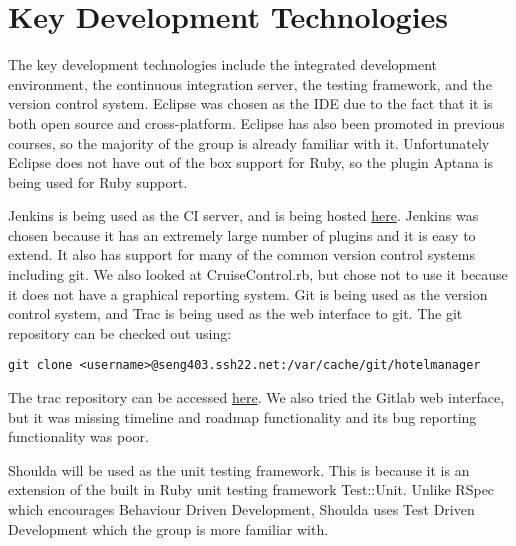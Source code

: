 \section{Key Development Technologies}

The key development technologies include the integrated development environment, the continuous integration server, the testing framework, and the version control system. Eclipse was chosen as the IDE due to the fact that it is both open source and cross-platform. Eclipse has also been promoted in previous courses, so the majority of the group is already familiar with it. Unfortunately Eclipse does not have out of the box support for Ruby, so the plugin Aptana is being used for Ruby support.

Jenkins is being used as the CI server, and is being hosted \href{http://seng403.ssh22.net/jenkins}{here}. Jenkins was chosen because it has an extremely large number of plugins and it is easy to extend. It also has support for many of the common version control systems including git. We also looked at CruiseControl.rb, but chose not to use it because it does not have a graphical reporting system. Git is being used as the version control system, and Trac is being used as the web interface to git. The git repository can be checked out using:
\lstset{language=bash}
\begin{lstlisting}
git clone <username>@seng403.ssh22.net:/var/cache/git/hotelmanager
\end{lstlisting}
The trac repository can be accessed \href{http://seng403.ssh22.net/trac}{here}. We also tried the Gitlab web interface, but it was missing timeline and roadmap functionality and its bug reporting functionality was poor.

Shoulda will be used as the unit testing framework. This is because it is an extension of the built in Ruby unit testing framework Test::Unit. Unlike RSpec which encourages Behaviour Driven Development, Shoulda uses Test Driven Development which the group is more familiar with.
